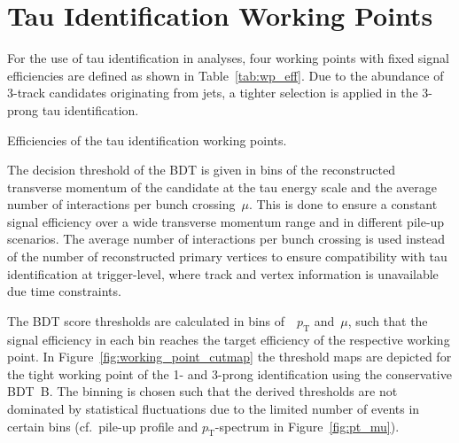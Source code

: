 \section{Tau Identification Working Points}
\label{sec:bdt_working_points}

For the use of tau identification in analyses, four working points with fixed
signal efficiencies are defined as shown in Table~\ref{tab:wp_eff}. Due to the
abundance of 3-track \tauhadvis candidates originating from jets, a tighter
selection is applied in the 3-prong tau identification.

\begin{table}[htb]
  \centering
  {\small}
  \caption{Efficiencies of the tau identification working points.}
  \label{tab:wp_eff}
\end{table}

The decision threshold of the BDT is given in bins of the reconstructed
transverse momentum of the \tauhadvis candidate at the tau energy scale and the
average number of interactions per bunch crossing~$\mu$. This is done to ensure
a constant signal efficiency over a wide transverse momentum range and in
different pile-up scenarios. The average number of interactions per bunch
crossing is used instead of the number of reconstructed primary vertices to
ensure compatibility with tau identification at trigger-level, where track and
vertex information is unavailable due time constraints.

The BDT score thresholds are calculated in bins of~\tauhadvis~$p_\text{T}$
and~$\mu$, such that the signal efficiency in each bin reaches the target
efficiency of the respective working point. In
Figure~\ref{fig:working_point_cutmap} the threshold maps are depicted for the
tight working point of the 1- and 3-prong identification using the conservative
\mbox{BDT B}. The binning is chosen such that the derived thresholds are not
dominated by statistical fluctuations due to the limited number of events in
certain bins (cf.\ pile-up profile and \tauhadvis $p_\text{T}$-spectrum in
Figure~\ref{fig:pt_mu}).

